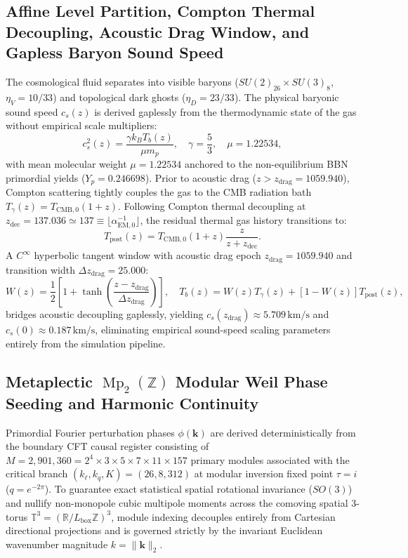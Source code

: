 \documentclass[11pt,letterpaper]{article}
\theoremstyle{plain}
\begin{document}
\subsection{Affine Level Partition, Compton Thermal Decoupling, Acoustic Drag Window, and Gapless Baryon Sound Speed}
The cosmological fluid separates into visible baryons ($SU(2)_{26} \times SU(3)_8$, $\eta_V = 10/33$) and topological dark ghosts ($\eta_D = 23/33$). The physical baryonic sound speed $c_s(z)$ is derived gaplessly from the thermodynamic state of the gas without empirical scale multipliers:
\begin{equation}
c_s^2(z) = \frac{\gamma k_B T_b(z)}{\mu m_p}, \quad \gamma = \frac{5}{3}, \quad \mu = 1.22534,
\end{equation}
with mean molecular weight $\mu = 1.22534$ anchored to the non-equilibrium BBN primordial yields ($Y_p = 0.246698$). Prior to acoustic drag ($z > z_{\mathrm{drag}} = 1059.940$), Compton scattering tightly couples the gas to the CMB radiation bath $T_\gamma(z) = T_{\mathrm{CMB}, 0}(1 + z)$. Following Compton thermal decoupling at $z_{\mathrm{dec}} = 137.036 \simeq 137 \equiv \lfloor \alpha_{\mathrm{EM},0}^{-1} \rfloor$, the residual thermal gas history transitions to:
\begin{equation}
T_{\mathrm{post}}(z) = T_{\mathrm{CMB}, 0} (1 + z) \frac{z}{z + z_{\mathrm{dec}}}.
\end{equation}
A $C^\infty$ hyperbolic tangent window with acoustic drag epoch $z_{\mathrm{drag}} = 1059.940$ and transition width $\Delta z_{\mathrm{drag}} = 25.000$:
\begin{equation}
W(z) = \frac{1}{2} \left[ 1 + \tanh\left( \frac{z - z_{\mathrm{drag}}}{\Delta z_{\mathrm{drag}}} \right) \right], \quad T_b(z) = W(z) T_\gamma(z) + [1 - W(z)] T_{\mathrm{post}}(z),
\end{equation}
bridges acoustic decoupling gaplessly, yielding $c_s(z_{\mathrm{drag}}) \approx 5.709 \, \mathrm{km/s}$ and $c_s(0) \approx 0.187 \, \mathrm{km/s}$, eliminating empirical sound-speed scaling parameters entirely from the simulation pipeline.


\subsection{Metaplectic \texorpdfstring{$\operatorname{Mp}_2(\mathbb{Z})$}{Mp2(Z)} Modular Weil Phase Seeding and Harmonic Continuity}
Primordial Fourier perturbation phases $\phi(\mathbf{k})$ are derived deterministically from the boundary CFT causal register consisting of $M = 2{,}901{,}360 = 2^4 \times 3 \times 5 \times 7 \times 11 \times 157$ primary modules associated with the critical branch $(k_\ell, k_q, K) = (26, 8, 312)$ at modular inversion fixed point $\tau = i$ ($q = e^{-2\pi}$). To guarantee exact statistical spatial rotational invariance ($SO(3)$) and nullify non-monopole cubic multipole moments across the comoving spatial 3-torus $\mathbb{T}^3 = (\mathbb{R} / L_{\mathrm{box}}\mathbb{Z})^3$, module indexing decouples entirely from Cartesian directional projections and is governed strictly by the invariant Euclidean wavenumber magnitude $k = \|\mathbf{k}\|_2$.
\end{document}
